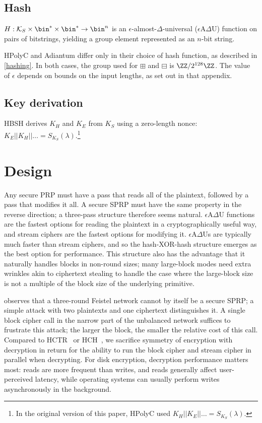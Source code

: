 \documentclass[journal=tosc,preprint,floatrow,submission]{iacrtrans}
\begin{document}
\subsection{Hash}
$H: \mathcal{K}_S \times \bin^{*} \times \bin^{*} \rightarrow \bin^n$
is an $\epsilon$-almost-$\Delta$-universal ($\epsilon$A$\Delta$U) function on pairs
of bitstrings, yielding a group element represented as an $n$-bit string.

HPolyC and Adiantum differ only in their choice of hash function, as described in \autoref{hashing}.
In both cases, the group used for $\boxplus$ and $\boxminus$ is $\ZZ/2^{128}\ZZ$.
The value of $\epsilon$ depends on bounds on the input lengths, as set out in that appendix.

\subsection{Key derivation}\label{keyderivation}
HBSH derives $K_H$ and $K_E$ from $K_S$ using a zero-length nonce:
$K_E || K_H || \ldots = S_{K_S}(\lambda)$.\footnote{In the original
version of this paper, HPolyC used $K_H || K_E || \ldots = S_{K_S}(\lambda)$.}

\section{Design}
Any secure PRP must have a pass that reads all of the plaintext, followed by a pass that modifies
it all. A secure SPRP must have the same property in the reverse direction;
a three-pass structure therefore seems natural.
$\epsilon$A$\Delta$U functions are the fastest options for reading the plaintext in a
cryptographically useful way, and stream ciphers are the fastest options for modifying it.
$\epsilon$A$\Delta$Us
are typically much faster than stream ciphers, and so the hash-XOR-hash structure emerges as
the best option for performance. This structure also has the advantage that it naturally handles
blocks in non-round sizes; many large-block modes need extra wrinkles akin to ciphertext stealing
to handle the case where the large-block size is not
a multiple of the block size of the underlying primitive.

\cite{luby-rackoff} observes that a three-round Feistel network cannot by itself be a secure SPRP;
a simple attack with two plaintexts and one ciphertext distinguishes it. A single block cipher call
in the narrow part of the unbalanced network suffices to frustrate this attack; the
larger the block, the smaller the relative cost of this call.
Compared to HCTR~\cite{hctr} or HCH~\cite{hch}, we sacrifice
symmetry of encryption with decryption in return for
the ability to run the block cipher and stream cipher in parallel when decrypting.
For disk encryption, decryption performance matters most:
reads are more frequent than writes, and reads generally affect user-perceived latency, while
operating systems can usually perform writes asynchronously in the background.
\end{document}
